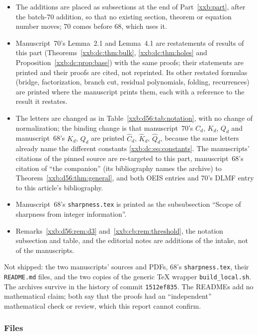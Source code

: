 \documentclass[11pt,a4paper]{article}
\numberwithin{equation}{section}
\theoremstyle{definition}
\theoremstyle{remark}
\theoremstyle{plain}
\begin{document}
\begin{itemize}[leftmargin=1.4em,itemsep=1pt]
\item The additions are placed as subsections at the end of
 Part~\ref{xxb:part}, after the batch-70 addition, so that no existing
 section, theorem or equation number moves; 70 comes before 68, which uses it.
\item Manuscript~70's Lemma~2.1 and Lemma~4.1 are restatements of results of
 this part (Theorems~\ref{xxb:dc:thm:bulk}, \ref{xxb:dc:thm:holes} and
 Proposition~\ref{xxb:dc:prop:base}) with the same proofs; their statements
 are printed and their proofs are cited, not reprinted.  Its other restated
 formulas (bridge, factorization, branch cut, residual polynomials, folding,
 recurrences) are printed where the manuscript prints them, each with a
 reference to the result it restates.
\item The letters are changed as in Table~\ref{xxb:d56:tab:notation}, with no
 change of normalization; the binding change is that manuscript~70's
 $C_d$, $K_d$, $Q_d$ and manuscript~68's $K_d$, $Q_d$ are printed
 $\widehat C_d$, $\widehat K_d$, $\widehat Q_d$, because the same letters
 already name the different constants \eqref{xxb:dc:eq:constants}.  The
 manuscripts' citations of the pinned source are re-targeted to this part,
 manuscript~68's citation of ``the companion'' (its bibliography names the
 archive) to Theorem~\ref{xxb:d56:thm:general}, and both OEIS entries and
 70's DLMF entry to this article's bibliography.
\item Manuscript~68's \texttt{sharpness.tex} is printed as the subsubsection
 ``Scope of sharpness from integer information''.
\item Remarks~\ref{xxb:d56:rem:d3} and~\ref{xxb:cb:rem:threshold}, the notation
 subsection and table, and the editorial notes are additions of the intake,
 not of the manuscripts.
\end{itemize}
Not shipped: the two manuscripts' sources and PDFs, 68's
\texttt{sharpness.tex}, their \texttt{README.md} files, and the two copies of
the generic TeX wrapper \texttt{build\_\allowbreak local.sh}.  The archives
survive in the history of commit \texttt{1512ef835}.  The READMEs add no
mathematical claim; both say that the proofs had an ``independent''
mathematical check or review, which this report cannot confirm.

\subsubsection{Files}
\end{document}
